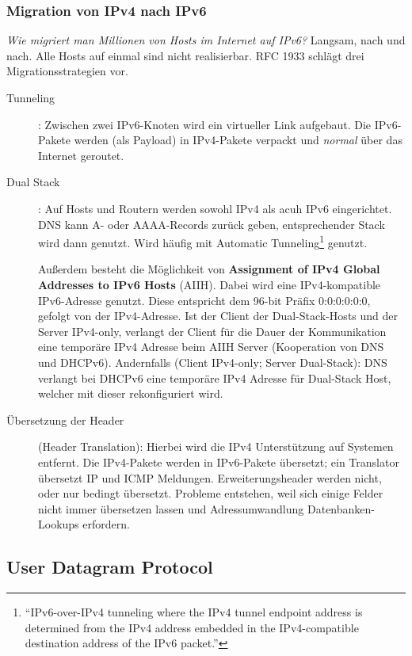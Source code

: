 \documentclass{article} %
\begin{document}
\subsubsection{Migration von IPv4 nach IPv6}

\emph{Wie migriert man Millionen von Hosts im Internet auf IPv6?}
Langsam, nach und nach.
Alle Hosts auf einmal sind nicht realisierbar.
RFC 1933\cite{rfc1933} schlägt drei Migrationsstrategien vor.

\begin{description}
	\item [Tunneling]: Zwischen zwei IPv6-Knoten wird ein virtueller Link aufgebaut.
	Die IPv6-Pakete werden (als Payload) in IPv4-Pakete verpackt und \emph{normal} über das Internet geroutet.
	\item [Dual Stack]: Auf Hosts und Routern werden sowohl IPv4 als acuh IPv6 eingerichtet.
	DNS kann A- oder AAAA-Records zurück geben, entsprechender Stack wird dann genutzt.
	Wird häufig mit Automatic Tunneling\footnote{\textquotedblleft IPv6-over-IPv4 tunneling where the IPv4 tunnel endpoint address is determined from the IPv4 address embedded in the IPv4-compatible destination address of the IPv6	packet.\textquotedblright} genutzt.
	
	Außerdem besteht die Möglichkeit von \textbf{Assignment of IPv4 Global Addresses to IPv6 Hosts} (AIIH).
	Dabei wird eine IPv4-kompatible IPv6-Adresse genutzt.
	Diese entspricht dem 96-bit Präfix 0:0:0:0:0:0, gefolgt von der IPv4-Adresse.
	Ist der Client der Dual-Stack-Hosts und der Server IPv4-only, verlangt der Client für die Dauer der Kommunikation eine	temporäre IPv4 Adresse beim AIIH Server (Kooperation von DNS und DHCPv6).
	Andernfalls (Client IPv4-only; Server Dual-Stack): DNS verlangt bei DHCPv6 eine temporäre IPv4 Adresse für Dual-Stack Host, welcher mit dieser rekonfiguriert wird.
	\item [Übersetzung der Header](Header Translation): Hierbei wird die IPv4 Unterstützung auf Systemen entfernt. Die IPv4-Pakete werden in IPv6-Pakete übersetzt; ein Translator übersetzt IP und ICMP Meldungen.
	Erweiterungsheader werden nicht, oder nur bedingt übersetzt.
	Probleme entstehen, weil sich einige Felder nicht immer übersetzen lassen und Adressumwandlung Datenbanken-Lookups erfordern.
\end{description}


\subsection{User Datagram Protocol}
\end{document}
